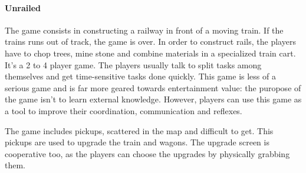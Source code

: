 \documentclass[12pt]{article}
\begin{document}
\clearpage

\paragraph{Unrailed} \cite{unrailed}
The game consists in constructing a railway in front of a moving train. If the trains runs out of track, the game is over. In order to construct rails, the players have to chop trees, mine stone and combine materials in a specialized train cart. It's a 2 to 4 player game. The players  usually talk to split tasks among themselves and get time-sensitive tasks done quickly. This game is less of a serious game and is far more geared towards entertainment value: the puropose of the game isn't to learn external knowledge. However, players can use this game as a tool to improve their coordination, communication and reflexes.

\vspace{0.4cm}

\vspace{0.4cm}
The game includes pickups, scattered in the map and difficult to get. This pickups are used to upgrade the train and wagons. The upgrade screen is cooperative too, as the players can choose the upgrades by physically grabbing them.

\vfill
{}
\end{document}
